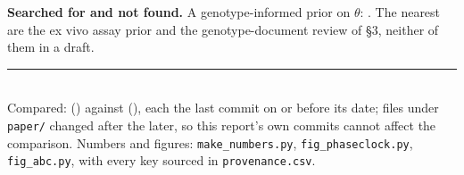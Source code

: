 \noindent\textbf{Searched for and not found.} A genotype-informed prior on $\theta$: \nf. The
nearest are the ex vivo assay prior and the genotype-document review of §3, neither of them in
a draft.

\medskip
\noindent\rule{\textwidth}{0.4pt}\\[2pt]
{\footnotesize Compared: \texttt{} () against
\texttt{} (), each the last commit on or before its date;
 files under \texttt{paper/} changed after the later, so this
report's own commits cannot affect the comparison. Numbers and figures:
\texttt{make\_numbers.py}, \texttt{fig\_phaseclock.py}, \texttt{fig\_abc.py}, with every key
sourced in \texttt{provenance.csv}.}
